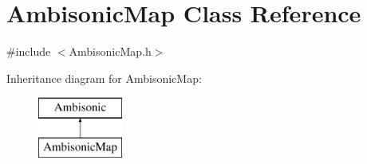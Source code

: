\hypertarget{class_ambisonic_map}{\section{Ambisonic\-Map Class Reference}
\label{class_ambisonic_map}
}


{\ttfamily \#include $<$Ambisonic\-Map.\-h$>$}

Inheritance diagram for Ambisonic\-Map\-:\begin{figure}[H]
\begin{center}
\leavevmode
\includegraphics[height=2.000000cm]{class_ambisonic_map}
\end{center}
\end{figure}
